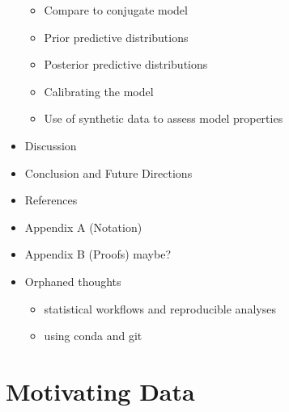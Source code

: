 \documentclass[
]{article}
\providecommand{\tightlist}{%
  \setlength{\itemsep}{0pt}\setlength{\parskip}{0pt}}
\begin{document}
\begin{itemize}
  \begin{itemize}
  \tightlist
  \item
    Compare to conjugate model
  \item
    Prior predictive distributions
  \item
    Posterior predictive distributions
  \item
    Calibrating the model
  \item
    Use of synthetic data to assess model properties
  \end{itemize}
\item
  Discussion
\item
  Conclusion and Future Directions
\item
  References
\item
  Appendix A (Notation)
\item
  Appendix B (Proofs) maybe?
\item
  Orphaned thoughts

  \begin{itemize}
  \tightlist
  \item
    statistical workflows and reproducible analyses
  \item
    using conda and git
  \end{itemize}
\end{itemize}

\hypertarget{motivating-data}{%
\section{Motivating Data}\label{motivating-data}}
\end{document}
